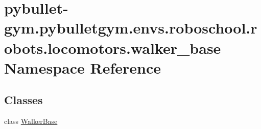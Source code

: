 \hypertarget{namespacepybullet-gym_1_1pybulletgym_1_1envs_1_1roboschool_1_1robots_1_1locomotors_1_1walker__base}{}\section{pybullet-\/gym.pybulletgym.\+envs.\+roboschool.\+robots.\+locomotors.\+walker\+\_\+base Namespace Reference}
\label{namespacepybullet-gym_1_1pybulletgym_1_1envs_1_1roboschool_1_1robots_1_1locomotors_1_1walker__base}
\subsection*{Classes}
\begin{DoxyCompactItemize}
\item 
class \hyperlink{classpybullet-gym_1_1pybulletgym_1_1envs_1_1roboschool_1_1robots_1_1locomotors_1_1walker__base_1_1_walker_base}{Walker\+Base}
\end{DoxyCompactItemize}
